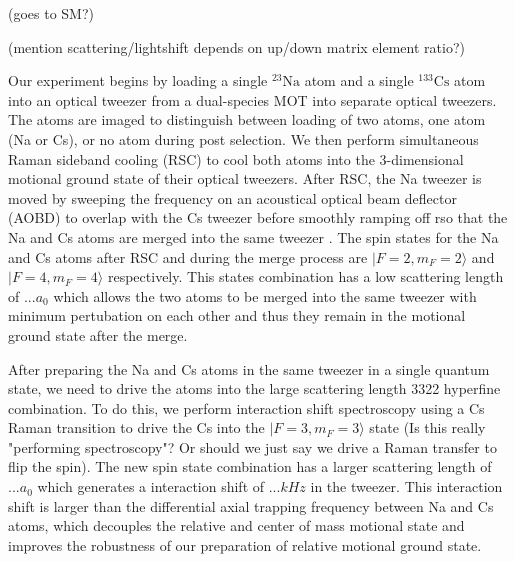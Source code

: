 \documentclass[aps,prl,twocolumn,groupedaddress]{revtex4-1}
\newcommand{\todo}[1]{}
\begin{document}
(goes to SM?)

(mention scattering/lightshift depends on up/down matrix element ratio?)



Our experiment begins by loading a single ${}^{23}\mathrm{Na}$ atom and a single ${}^{133}\mathrm{Cs}$ atom into an optical tweezer from a dual-species MOT\todo{cite na loading paper} into separate optical tweezers. The atoms are imaged to distinguish between loading of two atoms, one atom (Na or Cs), or no atom during post selection. We then perform simultaneous Raman sideband cooling (RSC) to cool both atoms into the 3-dimensional motional ground state of their optical tweezers. After RSC, the Na tweezer is moved by sweeping the frequency on an acoustical optical beam deflector (AOBD) to overlap with the Cs tweezer before smoothly ramping off rso that the Na and Cs atoms are merged into the same tweezer \todo{cite}. The spin states for the Na and Cs atoms after RSC and during the merge process are $|F=2,m_F=2\rangle$ and $|F=4,m_F=4\rangle$ respectively. This states combination has a low scattering length of $... a_0$ which allows the two atoms to be merged into the same tweezer with minimum pertubation on each other and thus they remain in the motional ground state after the merge.

After preparing the Na and Cs atoms in the same tweezer in a single quantum state, we need to drive the atoms into the large scattering length 3322 hyperfine combination. To do this, we perform interaction shift spectroscopy using a Cs Raman transition to drive the Cs into the $|F=3,m_F=3\rangle$ state (Is this really "performing spectroscopy"? Or should we just say we drive a Raman transfer to flip the spin). The new spin state combination has a larger scattering length of $... a_0$ which generates a interaction shift of $... kHz$ in the tweezer. This interaction shift is larger than the differential axial trapping frequency between Na and Cs atoms, which decouples the relative and center of mass motional state and improves the robustness of our preparation of relative motional ground state.

\end{document}
